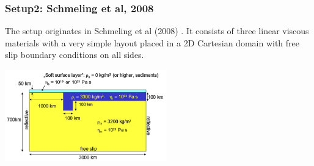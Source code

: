 \subsubsection{Setup2: Schmeling et al, 2008}

The setup originates in Schmeling et al (2008) \cite{scbe08}. It consists of three linear viscous
materials with a very simple layout placed in a 2D Cartesian domain with free slip boundary conditions 
on all sides. 

\begin{center}
\includegraphics[width=7cm]{python_codes/fieldstone_67/images/scbe08}
\end{center}

